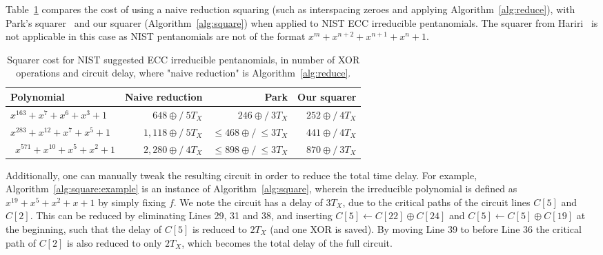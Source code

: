 Table~\ref{table:comparison_nist} compares the cost of using a naive reduction squaring (such as interspacing zeroes and applying Algorithm~\ref{alg:reduce}), with Park's squarer~\cite{park2012explicit} and our squarer (Algorithm~\ref{alg:square}) when applied to NIST ECC irreducible pentanomials. The squarer from Hariri~\cite{hariri2009bit} is not applicable in this case as NIST pentanomials are not of the format $x^m+x^{n+2}+x^{n+1}+x^{n}+1$. \\ 

\begin{table}
\centering
\smaller
\caption{Squarer cost for NIST suggested ECC irreducible pentanomials, in number of XOR operations and circuit delay, where "naive reduction" is Algorithm~\ref{alg:reduce}.}
{\begin{tabular}{l r r r} \label{table:comparison_nist}
Polynomial & Naive reduction & Park \cite{park2012explicit} & Our squarer \\ \hline
$x^{163} + x^7 + x^6 + x^3 + 1$ & $648\oplus/~5T_X$ & $246\oplus/~3T_X$ & $252\oplus/~4T_X$ \\ \hline
$x^{283} + x^{12} + x^7 + x^5 + 1$ & $1,118\oplus/~5T_X$ & $\leq468\oplus/~\leq3T_X$ & $441\oplus/~4T_X$ \\ \hline\
$x^{571} + x^{10} + x^5 + x^2 + 1$ & $2,280\oplus/~4T_X$ & $\leq898\oplus/~\leq3T_X$ & $870\oplus/~3T_X$
\end{tabular}}{}
\end{table}

Additionally, one can manually tweak the resulting circuit in order to reduce the total time delay. For example, Algorithm~\ref{alg:square:example} is an instance of Algorithm~\ref{alg:square}, wherein the irreducible polynomial is defined as $x^{19}+x^5+x^2+x+1$ by simply fixing $f$. We note the circuit has a delay of $3T_X$, due to the critical paths of the circuit lines $C[5]$ and $C[2]$. This can be reduced by eliminating Lines 29, 31 and 38, and inserting $C[5] \leftarrow C[22] \oplus C[24]$ and $C[5] \leftarrow C[5] \oplus C[19]$ at the beginning, such that the delay of $C[5]$ is reduced to $2 T_X$ (and one XOR is saved). By moving Line 39 to before Line 36 the critical path of $C[2]$ is also reduced to only $2 T_X$, which becomes the total delay of the full circuit.\\

